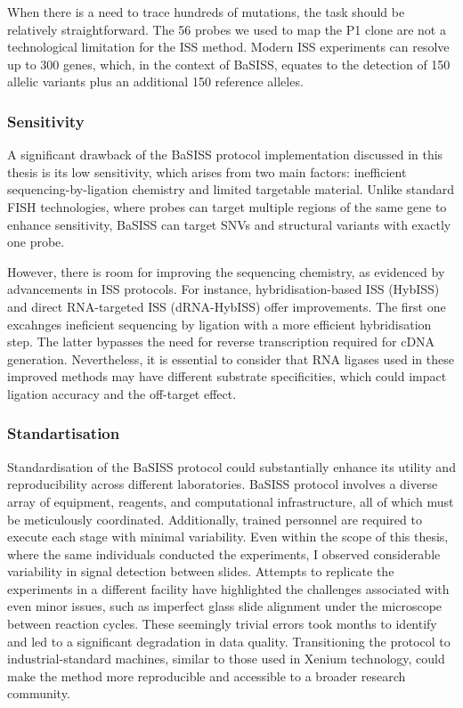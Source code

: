When there is a need to trace hundreds of mutations, the task should be relatively straightforward. The 56 probes we used to map the P1 clone are not a technological limitation for the \ac{ISS} method. Modern \ac{ISS} experiments can resolve up to 300 genes, which, in the context of \ac{BaSISS}, equates to the detection of 150 allelic variants plus an additional 150 reference alleles.

\subsubsection*{Sensitivity}

A significant drawback of the \ac{BaSISS} protocol implementation discussed in this thesis is its low sensitivity, which arises from two main factors: inefficient sequencing-by-ligation chemistry and limited targetable material. Unlike standard FISH technologies, where probes can target multiple regions of the same gene to enhance sensitivity, \ac{BaSISS} can target \acp{SNV} and structural variants with exactly one probe.

However, there is room for improving the sequencing chemistry, as evidenced by advancements in \ac{ISS} protocols. For instance, hybridisation-based \ac{ISS} (HybISS) \parencite{Gyllborg2020-uq} and direct RNA-targeted \ac{ISS} (dRNA-HybISS) \parencite{Lee2022-ha} offer improvements. The first one excahnges ineficient sequencing by ligation with a more efficient hybridisation step. The latter bypasses the need for reverse transcription required for cDNA generation. Nevertheless, it is essential to consider that RNA ligases used in these improved methods may have different substrate specificities, which could impact ligation accuracy and the off-target effect.

\subsubsection*{Standartisation}

Standardisation of the \ac{BaSISS} protocol could substantially enhance its utility and reproducibility across different laboratories. \ac{BaSISS} protocol involves a diverse array of equipment, reagents, and computational infrastructure, all of which must be meticulously coordinated. Additionally, trained personnel are required to execute each stage with minimal variability. Even within the scope of this thesis, where the same individuals conducted the experiments, I observed considerable variability in signal detection between slides. Attempts to replicate the experiments in a different facility have highlighted the challenges associated with even minor issues, such as imperfect glass slide alignment under the microscope between reaction cycles. These seemingly trivial errors took months to identify and led to a significant degradation in data quality. Transitioning the protocol to industrial-standard machines, similar to those used in Xenium technology, could make the method more reproducible and accessible to a broader research community.

